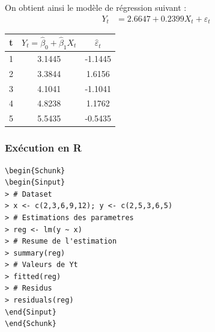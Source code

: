 \documentclass[11pt,french]{report}
\begin{document}
\bigskip
On obtient ainsi le modèle de régression suivant :
\begin{align*}
Y_t &= 2.6647 + 0.2399X_t + \varepsilon_t
\end{align*}

\begin{center}
\begin{tabular}{|c|c|c|}
\hline
t & $Y_t = \hat{\beta}_0 + \hat{\beta}_1X_t$ & $\hat{\varepsilon}_t$ \\
\hline
1 & 3.1445 & -1.1445 \\
2 & 3.3844 & 1.6156 \\
3 & 4.1041 & -1.1041 \\
4 & 4.8238 & 1.1762 \\
5 & 5.5435 & -0.5435 \\
\hline
\end{tabular}
\end{center}

\begin{center}
\end{center}

\bigskip
\subsubsection*{Exécution en R}
\begin{lstlisting}[linerange=\\begin\{Sinput\}-\\end\{Sinput\},includerangemarker=false, caption = Code source en R pour l'exemple]
\begin{Schunk}
\begin{Sinput}
> # Dataset
> x <- c(2,3,6,9,12); y <- c(2,5,3,6,5)
> # Estimations des parametres
> reg <- lm(y ~ x)
> # Resume de l'estimation
> summary(reg)
> # Valeurs de Yt
> fitted(reg)
> # Residus 
> residuals(reg)
\end{Sinput}
\end{Schunk}
\end{lstlisting}
\end{document}

